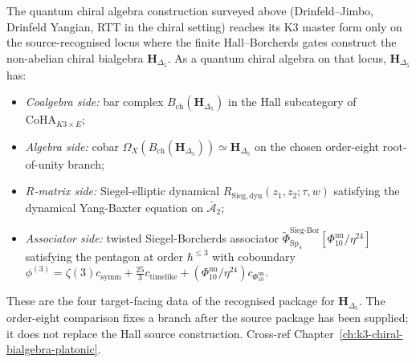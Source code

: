 \begin{remark}
\label{rem:qca-hdelta5-fourth-slot}
The quantum chiral algebra construction surveyed above (Drinfeld--Jimbo,
Drinfeld Yangian, RTT in the chiral setting) reaches its K3 master
form only on the source-recognised locus where the finite
Hall--Borcherds gates construct the non-abelian chiral bialgebra
$\mathbf H_{\Delta_5}$. As a quantum chiral algebra on that locus,
$\mathbf H_{\Delta_5}$ has:
\begin{itemize}
\item \emph{Coalgebra side:} bar complex $B_{\mathrm{ch}}(\mathbf H_{\Delta_5})$
 in the Hall subcategory of $\mathrm{CoHA}_{K3\times E}$;
\item \emph{Algebra side:} cobar $\Omega_X(B_{\mathrm{ch}}(\mathbf H_{\Delta_5}))\simeq\mathbf H_{\Delta_5}$
 on the chosen order-eight root-of-unity branch;
\item \emph{$R$-matrix side:} Siegel-elliptic dynamical $R_{\mathrm{Sieg,dyn}}(z_1,z_2;\tau,w)$
 satisfying the dynamical Yang-Baxter equation on $\bar{\mathcal A}_2$;
\item \emph{Associator side:} twisted Siegel-Borcherds associator
 $\widetilde\Phi^{\mathrm{Sieg\text{-}Bor}}_{\mathrm{Sp}_4}[\Phi_{10}^{\mathrm{un}}/\eta^{24}]$
 satisfying the pentagon at order $\hbar^{\le 3}$ with coboundary
 $\phi^{(3)} = \zeta(3) c_{\mathrm{symm}} + \tfrac{25}{3} c_{\mathrm{timelike}} + (\Phi_{10}^{\mathrm{un}}/\eta^{24}) c_{\Phi_{10}^{\mathrm{un}}}$.
\end{itemize}
These are the four target-facing data of the recognised package for
$\mathbf H_{\Delta_5}$. The order-eight comparison fixes a branch after
the source package has been supplied; it does not replace the Hall
source construction. Cross-ref
Chapter~\ref{ch:k3-chiral-bialgebra-platonic}.
\end{remark}

